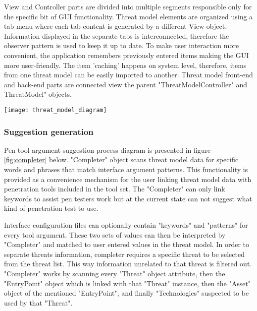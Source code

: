 View and Controller parts are divided into multiple segments responsible only for the specific bit of GUI functionality. Threat model elements are organized using a tab menu where each tab content is generated by a different View object. Information displayed in the separate tabs is interconnected, therefore the observer pattern is used to keep it up to date. To make user interaction more convenient, the application remembers previously entered items making the GUI more user-friendly. The item 'caching' happens on system level, therefore, items from one threat model can be easily imported to another. Threat model front-end and back-end parts are connected view the parent "ThreatModelController" and ThreatModel" objects.


\begin{center}
	\begin{sideways}%
		\begin{minipage}{\textheight}
			\texttt{[image: threat\_model\_diagram]}
			\label{fig:threat-model-struct}
		\end{minipage}
	\end{sideways}
\end{center}

\subsubsection{Suggestion generation}
Pen tool argument suggestion process diagram is presented in figure \ref{fig:completer} below.\newline
"Completer" object scans threat model data for specific words and phrases that match interface argument patterns. This functionality is provided as a convenience mechanism for the user linking threat model data with penetration tools included in the tool set. The "Completer" can only link keywords to assist pen testers work but at the current state can not suggest what kind of penetration test to use.

Interface configuration files can optionally contain "keywords" and "patterns" for every tool argument. These two sets of values can then be interpreted by "Completer" and matched to user entered values in the threat model. In order to separate threats information, completer requires a specific threat  to be selected from the threat list. This way information unrelated to that threat is filtered out. "Completer" works by scanning every "Threat" object attribute, then the "EntryPoint" object which is linked with that "Threat" instance, then the "Asset" object of the mentioned "EntryPoint", and finally "Technologies" suspected to be used by that "Threat".

